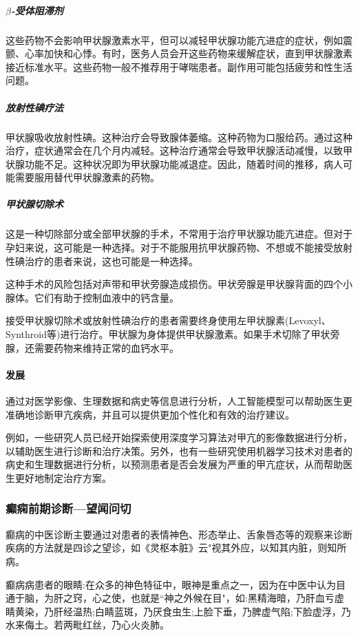 \documentclass[letterpaper,12pt]{article}
\begin{document}
					\subparagraph{$\beta$-受体阻滞剂}\qquad
						
					这些药物不会影响甲状腺激素水平，但可以减轻甲状腺功能亢进症的症状，例如震颤、心率加快和心悸。有时，医务人员会开这些药物来缓解症状，直到甲状腺激素接近标准水平。这些药物一般不推荐用于哮喘患者。副作用可能包括疲劳和性生活问题。
					
					\subparagraph{放射性碘疗法}\qquad
					
					甲状腺吸收放射性碘。这种治疗会导致腺体萎缩。这种药物为口服给药。通过这种治疗，症状通常会在几个月内减轻。这种治疗通常会导致甲状腺活动减慢，以致甲状腺功能不足。这种状况即为甲状腺功能减退症。因此，随着时间的推移，病人可能需要服用替代甲状腺激素的药物。
			
					\subparagraph{甲状腺切除术}\qquad
					
					这是一种切除部分或全部甲状腺的手术，不常用于治疗甲状腺功能亢进症。但对于孕妇来说，这可能是一种选择。对于不能服用抗甲状腺药物、不想或不能接受放射性碘治疗的患者来说，这也可能是一种选择。
			
					这种手术的风险包括对声带和甲状旁腺造成损伤。甲状旁腺是甲状腺背面的四个小腺体。它们有助于控制血液中的钙含量。
					
					接受甲状腺切除术或放射性碘治疗的患者需要终身使用左甲状腺素(Levoxyl、Synthroid等)进行治疗。甲状腺为身体提供甲状腺激素。如果手术切除了甲状旁腺，还需要药物来维持正常的血钙水平。
						
				\paragraph{发展}\qquad
				
				通过对医学影像、生理数据和病史等信息进行分析，人工智能模型可以帮助医生更准确地诊断甲亢疾病，并且可以提供更加个性化和有效的治疗建议。
				
				例如，一些研究人员已经开始探索使用深度学习算法对甲亢的影像数据进行分析，以辅助医生进行诊断和治疗决策。另外，也有一些研究使用机器学习技术对患者的病史和生理数据进行分析，以预测患者是否会发展为严重的甲亢症状，从而帮助医生更好地制定治疗方案。
		
			\subsubsection{癫痫前期诊断---望闻问切}
			
			癫病的中医诊断主要通过对患者的表情神色、形态举止、舌象唇态等的观察来诊断疾病的方法就是四诊之望诊，如《灵枢本脏》云"视其外应，以知其内脏，则知所病。
			
			癫病病患者的眼睛:在众多的神色特征中，眼神是重点之一，因为在中医中认为目通于脑，为肝之窍，心之使，也就是“神之外候在目"，如:黑精海暗，乃肝血亏虚睛黄染，乃肝经温热;白睛蓝斑，乃厌食虫生;上脸下垂，乃脾虚气陷;下脸虚浮，乃水来侮土。若两毗红丝，乃心火炎肺。
			
\end{document}
